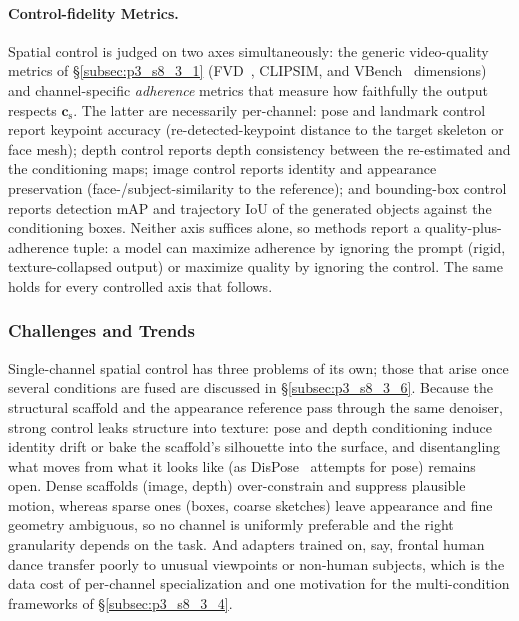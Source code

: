 \paragraph{Control-fidelity Metrics.}
Spatial control is judged on two axes simultaneously: the generic video-quality metrics of §\ref{subsec:p3_s8_3_1} (FVD~\cite{unterthiner2018fvd}, CLIPSIM, and VBench~\cite{huang2023vbench} dimensions) and channel-specific \emph{adherence} metrics that measure how faithfully the output respects $\mathbf{c}_{\text{s}}$. The latter are necessarily per-channel: pose and landmark control report keypoint accuracy (re-detected-keypoint distance to the target skeleton or face mesh); depth control reports depth consistency between the re-estimated and the conditioning maps; image control reports identity and appearance preservation (face-/subject-similarity to the reference); and bounding-box control reports detection mAP and trajectory IoU of the generated objects against the conditioning boxes. Neither axis suffices alone, so methods report a quality-plus-adherence tuple: a model can maximize adherence by ignoring the prompt (rigid, texture-collapsed output) or maximize quality by ignoring the control. The same holds for every controlled axis that follows.

\subsubsection{Challenges and Trends}
\label{subsubsec:p3_s8_3_2_challenges}
Single-channel spatial control has three problems of its own; those that arise once several conditions are fused are discussed in §\ref{subsec:p3_s8_3_6}. Because the structural scaffold and the appearance reference pass through the same denoiser, strong control leaks structure into texture: pose and depth conditioning induce identity drift or bake the scaffold's silhouette into the surface, and disentangling what moves from what it looks like (as DisPose~\cite{li2024dispose} attempts for pose) remains open. Dense scaffolds (image, depth) over-constrain and suppress plausible motion, whereas sparse ones (boxes, coarse sketches) leave appearance and fine geometry ambiguous, so no channel is uniformly preferable and the right granularity depends on the task. And adapters trained on, say, frontal human dance transfer poorly to unusual viewpoints or non-human subjects, which is the data cost of per-channel specialization and one motivation for the multi-condition frameworks of §\ref{subsec:p3_s8_3_4}.
